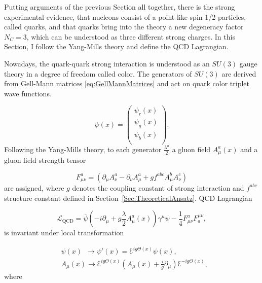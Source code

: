 Putting arguments of the previous Section all together, there is the strong
experimental evidence, that nucleons consist of a point-like spin-1/2 particles,
called quarks, and that quarks bring into the theory a new degeneracy factor $N_C =
3$, which can be understood as three different strong charges. In
this Section, I follow the Yang-Mills theory \cite{YangMill} and define the QCD
Lagrangian.

Nowadays, the quark-quark strong interaction is understood as an $SU(3)$ gauge theory in
a degree of freedom called color. The generators of $SU(3)$ are derived from
Gell-Mann matrices \eqref{eq:GellMannMatrices} and act on quark color triplet
wave functions.

\begin{equation}
  \psi(x) = \begin{pmatrix}  
    \psi_r(x) \\ \psi_g(x) \\ \psi_b(x) \\ 
            \end{pmatrix}.
  \label{eq:QuarkWaveFunction}
\end{equation}
Following the Yang-Mills theory, to each generator
$\frac{\lambda^a}{2}$ a gluon field $A_\mu^a(x)$ and a gluon field strength tensor

\begin{equation}
  F_{\mu\nu}^a = \left( \partial_\mu A_\nu^a - \partial_\nu A_\mu^a + g f^{abc}
  A_\mu^b A_\nu^c \right)
  \label{eq:GluonFieldStrengthTensor}
\end{equation}
are assigned, where $g$ denotes the coupling constant of strong interaction and
$f^{abc}$ structure constant defined in Section~\ref{Sec:TheoreticalAnsatz}.
QCD Lagrangian

\begin{equation}
  \mathscr{L}_{\text{QCD}} = \bar{\psi} \left( -i \partial_\mu + g \frac{\lambda}{2}
  A_\mu^a(x) \right) \gamma^\mu \psi - \frac{1}{4}F_{\mu\nu}^aF_a^{\mu\nu},
  \label{eq:QCDLagrangian}
\end{equation}
is invariant under local transformation

\begin{align}
  &\psi(x) \, \, \, \rightarrow \psi'(x) = \Euler^{ig\Theta(x)} \psi(x),
    \label{eq:QCDGaugeTranform} \\
  &A_\mu(x) \rightarrow \Euler^{ig\Theta(x)} \left( A_\mu(x) +
    \frac{i}{g}\partial_\mu \right) \Euler^{-ig\Theta(x)}, 
  \nonumber
\end{align}
where

